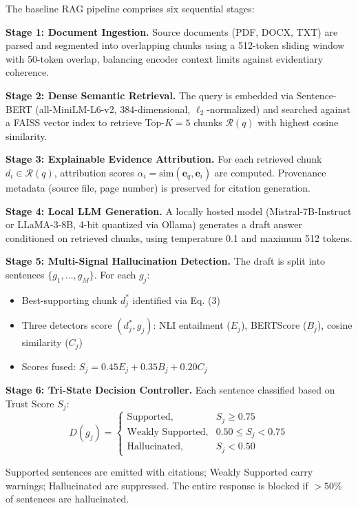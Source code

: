 \documentclass[conference]{IEEEtran}
\begin{document}
The baseline RAG pipeline comprises six sequential stages:

\textbf{Stage 1: Document Ingestion.} Source documents (PDF, DOCX, TXT) are parsed and segmented into overlapping chunks using a 512-token sliding window with 50-token overlap, balancing encoder context limits against evidentiary coherence.

\textbf{Stage 2: Dense Semantic Retrieval.} The query is embedded via Sentence-BERT (all-MiniLM-L6-v2, 384-dimensional, $\ell_2$-normalized) and searched against a FAISS vector index to retrieve Top-$K=5$ chunks $\mathcal{R}(q)$ with highest cosine similarity.

\textbf{Stage 3: Explainable Evidence Attribution.} For each retrieved chunk $d_i \in \mathcal{R}(q)$, attribution scores $\alpha_i = \text{sim}(\mathbf{e}_q, \mathbf{e}_i)$ are computed. Provenance metadata (source file, page number) is preserved for citation generation.

\textbf{Stage 4: Local LLM Generation.} A locally hosted model (Mistral-7B-Instruct or LLaMA-3-8B, 4-bit quantized via Ollama) generates a draft answer conditioned on retrieved chunks, using temperature 0.1 and maximum 512 tokens.

\textbf{Stage 5: Multi-Signal Hallucination Detection.} The draft is split into sentences $\{g_1, \ldots, g_M\}$. For each $g_j$:
\begin{itemize}
    \item Best-supporting chunk $d^*_j$ identified via Eq. (3)
    \item Three detectors score $(d^*_j, g_j)$: NLI entailment ($E_j$), BERTScore ($B_j$), cosine similarity ($C_j$)
    \item Scores fused: $S_j = 0.45 E_j + 0.35 B_j + 0.20 C_j$
\end{itemize}

\textbf{Stage 6: Tri-State Decision Controller.} Each sentence classified based on Trust Score $S_j$:
\begin{equation}
D(g_j) = \begin{cases}
\text{Supported}, & S_j \geq 0.75 \\
\text{Weakly Supported}, & 0.50 \leq S_j < 0.75 \\
\text{Hallucinated}, & S_j < 0.50
\end{cases}
\end{equation}

Supported sentences are emitted with citations; Weakly Supported carry warnings; Hallucinated are suppressed. The entire response is blocked if $>50\%$ of sentences are hallucinated.
\end{document}
